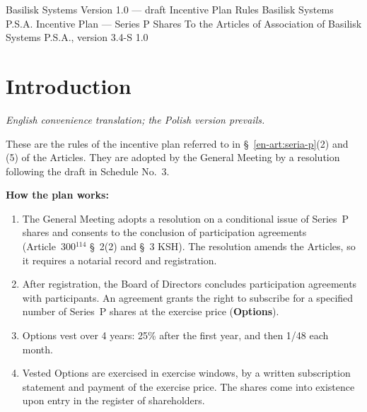 \documentclass[11pt,a4paper]{report}
\newcommand{\US}[1]{\S~#1 of the Articles}
\begin{document}
\BusinessPlanTitlePage
  {Basilisk Systems}
  {Version 1.0 --- draft}
  {Incentive Plan Rules}
  {Basilisk Systems P.S.A. Incentive Plan --- Series P Shares}
  {To the Articles of Association of Basilisk Systems P.S.A., version 3.4-S}
  {1.0}

\tableofcontents
\newpage

\chapter*{Introduction}

{\small\itshape English convenience translation; the Polish version prevails.\par}

These are the rules of the incentive plan referred to in \US{\ref{en-art:seria-p}(2) and (5)}. They are adopted by the General Meeting by a resolution following the draft in Schedule No.~3.

\textbf{How the plan works:}
\begin{enumerate}
  \item The General Meeting adopts a resolution on a conditional issue of Series~P shares and consents to the conclusion of participation agreements (Article~300$^{114}$ \S~2(2) and \S~3 KSH). The resolution amends the Articles, so it requires a notarial record and registration.
  \item After registration, the Board of Directors concludes participation agreements with participants. An agreement grants the right to subscribe for a specified number of Series~P shares at the exercise price (\textbf{Options}).
  \item Options vest over 4 years: 25\% after the first year, and then 1/48 each month.
  \item Vested Options are exercised in exercise windows, by a written subscription statement and payment of the exercise price. The shares come into existence upon entry in the register of shareholders.
\end{enumerate}
\end{document}
